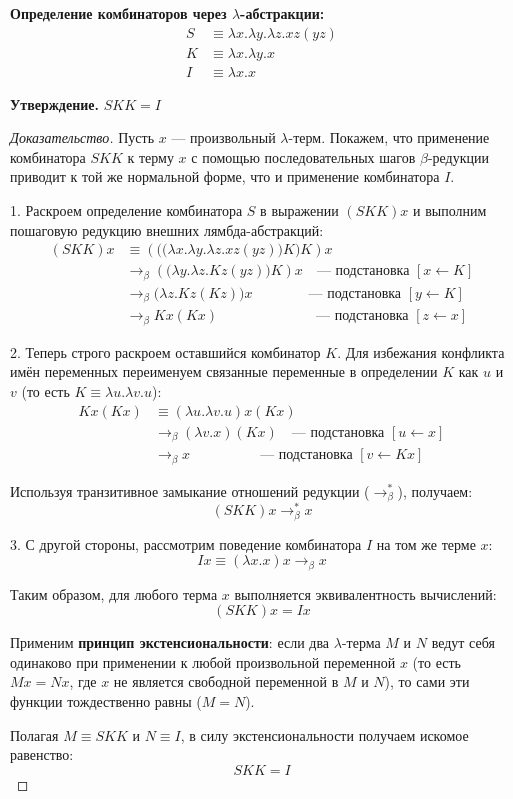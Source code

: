\documentclass{article}
\begin{document}
\noindent\textbf{Определение комбинаторов через $\lambda$-абстракции:}
\begin{align*}
    S &\equiv \lambda x. \lambda y. \lambda z. x z (y z) \\
    K &\equiv \lambda x. \lambda y. x \\
    I &\equiv \lambda x. x
\end{align*}

\noindent\textbf{Утверждение.} $SKK = I$

\begin{proof}[Доказательство]
Пусть $x$ — произвольный $\lambda$-терм. Покажем, что применение комбинатора $SKK$ к терму $x$ с помощью последовательных шагов $\beta$-редукции приводит к той же нормальной форме, что и применение комбинатора $I$.

1. Раскроем определение комбинатора $S$ в выражении $(SKK)x$ и выполним пошаговую редукцию внешних лямбда-абстракций:
\begin{align*}
    (SKK)x &\equiv \left( \Big( \big( \lambda x. \lambda y. \lambda z. x z (y z) \big) K \Big) K \right) x \\
    &\rightarrow_\beta \left( \big( \lambda y. \lambda z. K z (y z) \big) K \right) x \quad \text{--- подстановка } [x \leftarrow K] \\
    &\rightarrow_\beta \big( \lambda z. K z (K z) \big) x \qquad\qquad \text{--- подстановка } [y \leftarrow K] \\
    &\rightarrow_\beta K x (K x) \qquad\qquad\qquad\quad \text{--- подстановка } [z \leftarrow x]
\end{align*}

2. Теперь строго раскроем оставшийся комбинатор $K$. Для избежания конфликта имён переменных переименуем связанные переменные в определении $K$ как $u$ и $v$ (то есть $K \equiv \lambda u. \lambda v. u$):
\begin{align*}
    K x (K x) &\equiv (\lambda u. \lambda v. u) x (K x) \\
    &\rightarrow_\beta (\lambda v. x) (K x) \quad \text{--- подстановка } [u \leftarrow x] \\
    &\rightarrow_\beta x \qquad\qquad\quad \text{--- подстановка } [v \leftarrow K x]
\end{align*}

Используя транзитивное замыкание отношений редукции ($\rightarrow_\beta^*$), получаем:
\[ (SKK)x \rightarrow_\beta^* x \]

3. С другой стороны, рассмотрим поведение комбинатора $I$ на том же терме $x$:
\[ Ix \equiv (\lambda x. x) x \rightarrow_\beta x \]

Таким образом, для любого терма $x$ выполняется эквивалентность вычислений:
\[ (SKK)x = Ix \]

Применим \textbf{принцип экстенсиональности}: если два $\lambda$-терма $M$ и $N$ ведут себя одинаково при применении к любой произвольной переменной $x$ (то есть $M x = N x$, где $x$ не является свободной переменной в $M$ и $N$), то сами эти функции тождественно равны ($M = N$).

Полагая $M \equiv SKK$ и $N \equiv I$, в силу экстенсиональности получаем искомое равенство:
\[ SKK = I \]
\end{proof}
\end{document}

